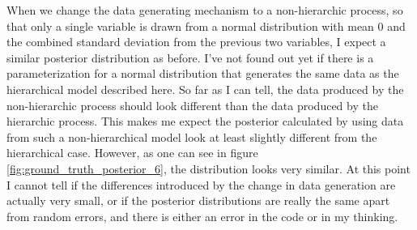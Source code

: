 \documentclass{article}
\begin{document}

When we change the data generating mechanism to a non-hierarchic process, so that only a single variable is drawn from a normal distribution with mean 0 and the combined standard deviation from the previous two variables, I expect a similar posterior distribution as before. I've not found out yet if there is a parameterization for a normal distribution that generates the same data as the hierarchical model described here. So far as I can tell, the data produced by the non-hierarchic process should look different than the data produced by the hierarchic process. This makes me expect the posterior calculated by using data from such a non-hierarchical model look at least slightly different from the hierarchical case. However, as one can see in figure \ref{fig:ground_truth_posterior_6}, the distribution looks very similar. At this point I cannot tell if the differences introduced by the change in data generation are actually very small, or if the posterior distributions are really the same apart from random errors, and there is either an error in the code or in my thinking.
\end{document}

